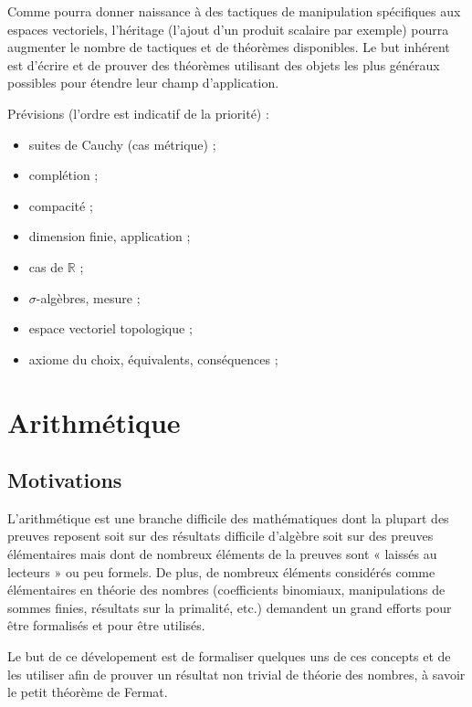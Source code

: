 Comme  pourra donner naissance à des tactiques de manipulation spécifiques aux espaces vectoriels, %
l'héritage (l'ajout d'un produit scalaire par exemple) pourra augmenter le nombre de tactiques et de théorèmes disponibles. Le but inhérent est d'écrire et de prouver des théorèmes utilisant des objets les plus généraux possibles pour étendre leur champ d'application.

Prévisions (l'ordre est indicatif de la priorité) :
\begin{itemize}
  \item suites de Cauchy (cas métrique) ;
  \item complétion ;
  \item compacité ;
  \item dimension finie, application ; %
  \item cas de $\mathbb{R}$ ;
  \item $\sigma$-algèbres, mesure ;
  \item espace vectoriel topologique ; %
  \item axiome du choix, équivalents, conséquences ; %
\end{itemize}

\section{Arithmétique}

\subsection{Motivations}

L'arithmétique est une branche difficile des mathématiques dont la plupart des preuves reposent soit sur des résultats difficile d'algèbre soit sur des preuves élémentaires mais dont de nombreux éléments de la preuves sont « laissés au lecteurs » ou peu formels. De plus, de nombreux éléments considérés comme élémentaires en théorie des nombres (coefficients binomiaux, manipulations de sommes finies, résultats sur la primalité, etc.) demandent un grand efforts pour être formalisés et pour être utilisés.

Le but de ce dévelopement est de formaliser quelques uns de ces concepts et de les utiliser afin de prouver un résultat non trivial de théorie des nombres, à savoir le petit théorème de Fermat.

